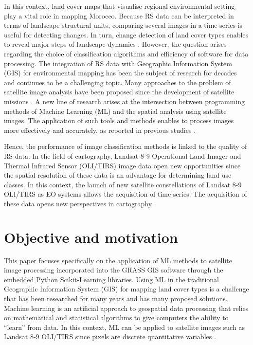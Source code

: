 \documentclass[geomatics,article,submit,pdftex,moreauthors]{Definitions/mdpi}
\begin{document}
In this context, land cover maps that visualise regional environmental setting play a vital role in mapping Morocco. Because RS data can be interpreted in terms of landscape structural units, comparing several images in a time series is useful for detecting changes. In turn, change detection of land cover types enables to reveal major steps of landscape dynamics \cite{CAI2023103226,Lemenkova202405,XIONG2022109132}. However, the question arises regarding the choice of classification algorithms and efficiency of software for data processing. The integration of RS data with Geographic Information System (GIS) for environmental mapping has been the subject of research for decades and continues to be a challenging topic. Many approaches to the problem of satellite image analysis have been proposed since the development of satellite missions \cite{NOY2023103377,Lemenkova202403,Su02062020,Potter18102014,Lemenkova202402}. A new line of research  arises at the intersection between programming methods of Machine Learning (ML) and the spatial analysis using satellite images. The application of such tools and methods enables to process images more effectively and accurately, as reported in previous studies \cite{rs16244812,w17010050,fire8010008}. 

Hence, the performance of image classification methods is linked to the quality of RS data. In the field of cartography, Landsat 8-9 Operational Land Imager and Thermal Infrared Sensor (OLI/TIRS) image data open new opportunities since the spatial resolution of these data is an advantage for determining land use classes. In this context, the launch of new satellite constellations of Landsat 8-9 OLI/TIRS as EO systems allows the acquisition of time series. The acquisition of these data opens new perspectives in cartography \cite{Farah05012010,Lemenkova202322,Layati03042022,Layati28082024}.

\section{Objective and motivation}

This paper focuses specifically on the application of ML methods to satellite image processing incorporated into the GRASS GIS software through the embedded Python Scikit-Learning libraries. Using ML in the traditional Geographic Information System (GIS) for mapping land cover types is a challenge that has been researched for many years and has many proposed solutions. Machine learning is an artificial approach to geospatial data processing that relies on mathematical and statistical algorithms to give computers the ability to “learn” from data. In this context, ML can be applied to satellite images such as Landsat 8-9 OLI/TIRS since pixels are discrete quantitative variables \cite{DAPAZGOMES,Lemenkova202026,LAROCHEPINEL2024109163}. 
\end{document}
